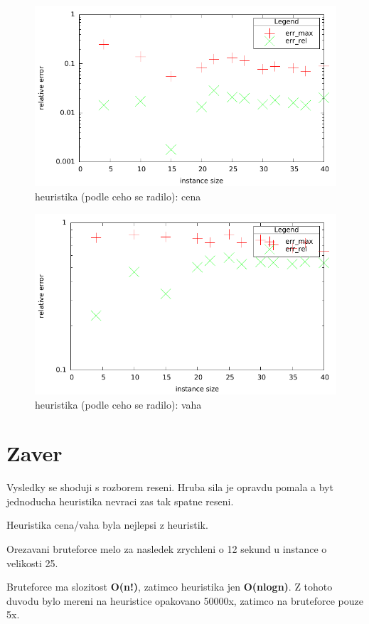 \documentclass[12pt,a4paper]{article}
\begin{document}
\begin{figure}[H]
	\caption{heuristika (podle ceho se radilo): cena}
	\includegraphics{./err_h2.pdf}
\end{figure}

\begin{figure}[H]
	\caption{heuristika (podle ceho se radilo): vaha}
	\includegraphics{./err_h3.pdf}
\end{figure}


\section{Zaver}
Vysledky se shoduji s rozborem reseni. Hruba sila je opravdu pomala a byt jednoducha heuristika nevraci zas tak spatne reseni.

Heuristika cena/vaha byla nejlepsi z heuristik.

Orezavani bruteforce melo za nasledek zrychleni o 12 sekund u instance o velikosti 25.

Bruteforce ma slozitost \textbf{O(n!)}, zatimco heuristika jen \textbf{O(nlogn)}. Z tohoto duvodu bylo mereni na heuristice opakovano 50000x, zatimco na bruteforce pouze 5x.
\end{document}
